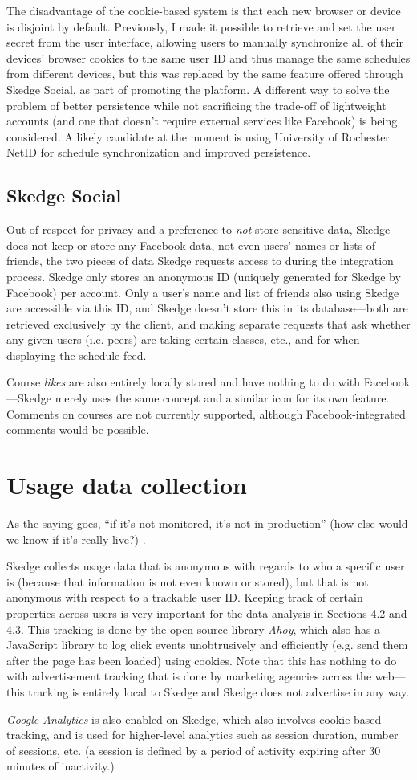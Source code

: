 The disadvantage of the cookie-based system is that each new browser or device is disjoint by default. Previously, I made it possible to retrieve and set the user secret from the user interface, allowing users to manually synchronize all of their devices' browser cookies to the same user ID and thus manage the same schedules from different devices, but this was replaced by the same feature offered through Skedge Social, as part of promoting the platform. A different way to solve the problem of better persistence while not sacrificing the trade-off of lightweight accounts (and one that doesn't require external services like Facebook) is being considered. A likely candidate at the moment is using University of Rochester NetID for schedule synchronization and improved persistence.

\subsection{Skedge Social}

Out of respect for privacy and a preference to \emph{not} store sensitive data, Skedge does not keep or store any Facebook data, not even users' names or lists of friends, the two pieces of data Skedge requests access to during the integration process. Skedge only stores an anonymous ID (uniquely generated for Skedge by Facebook) per account. Only a user’s name and list of friends also using Skedge are accessible via this ID, and Skedge doesn't store this in its database---both are retrieved exclusively by the client, and making separate requests that ask whether any given users (i.e. peers) are taking certain classes, etc., and for when displaying the schedule feed.

Course \emph{likes} are also entirely locally stored and have nothing to do with Facebook---Skedge merely uses the same concept and a similar icon for its own feature. Comments on courses are not currently supported, although Facebook-integrated comments would be possible.

\section{Usage data collection}

As the saying goes, ``if it's not monitored, it's not in production'' (how else would we know if it's really live?) \cite{monitored}.

Skedge collects usage data that is anonymous with regards to who a specific user is (because that information is not even known or stored), but that is not anonymous with respect to a trackable user ID. Keeping track of certain properties across users is very important for the data analysis in Sections 4.2 and 4.3. This tracking is done by the open-source library \emph{Ahoy}, which also has a JavaScript library to log click events unobtrusively and efficiently (e.g. send them after the page has been loaded) using cookies. Note that this has nothing to do with advertisement tracking that is done by marketing agencies across the web---this tracking is entirely local to Skedge and Skedge does not advertise in any way.

\emph{Google Analytics} is also enabled on Skedge, which also involves cookie-based tracking, and is used for higher-level analytics such as session duration, number of sessions, etc. (a session is defined by a period of activity expiring after 30 minutes of inactivity.)